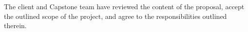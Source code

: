 The client and Capstone team have reviewed the content of the proposal, accept the outlined scope of the project, and agree to the responsibilities outlined therein.